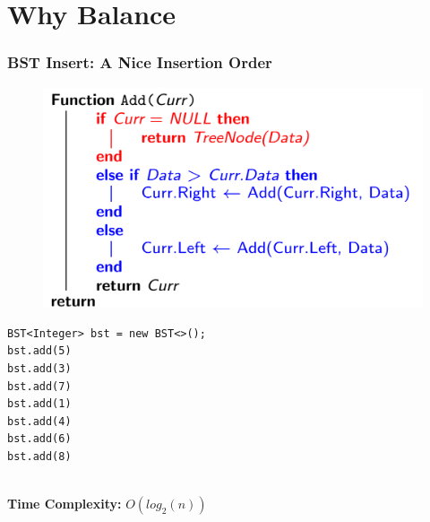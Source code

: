 \documentclass{beamer}
\begin{document}
\section{Why Balance}
\begin{frame}[fragile]
    \frametitle{BST Insert: A Nice Insertion Order}
    \begin{minipage}{0.45\textwidth}
        \begin{figure}
            \includegraphics[width=\textwidth]{./imgs/bstadd.png}
        \end{figure}
        \begin{lstlisting}[frame=trBL, basicstyle=\tiny]
BST<Integer> bst = new BST<>();
bst.add(5)
bst.add(3)
bst.add(7)
bst.add(1)
bst.add(4)
bst.add(6)
bst.add(8)
        \end{lstlisting}
    \end{minipage}
    \begin{minipage}{0.45\textwidth}
    \end{minipage}
    \pause 
    \\\textbf{Time Complexity: } $O(log_{2}(n))$
\end{frame}
\end{document}
